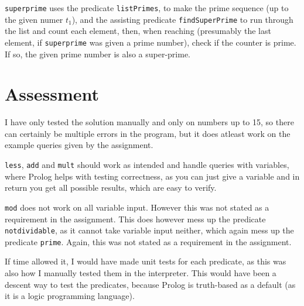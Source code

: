 \documentclass[a4paper, 10pt]{article}
\begin{document}
\texttt{superprime} uses the predicate \texttt{listPrimes}, to make the prime sequence (up to the given numer $t_1$), and the assisting predicate \texttt{findSuperPrime} to run through the list and count each element, then, when reaching (presumably the last element, if \texttt{superprime} was given a prime number), check if the counter is prime. If so, the given prime number is also a super-prime.


\section*{Assessment}
I have only tested the solution manually and only on numbers up to 15, so there can certainly be multiple errors in the program, but it does atleast work on the example queries given by the assignment.

\texttt{less}, \texttt{add} and \texttt{mult} should work as intended and handle queries with variables, where Prolog helps with testing correctness, as you can just give a variable and in return you get all possible results, which are easy to verify.

\texttt{mod} does not work on all variable input. However this was not stated as a requirement in the assignment. This does however mess up the predicate \texttt{notdividable}, as it cannot take variable input neither, which again mess up the predicate \texttt{prime}. Again, this was not stated as a requirement in the assignment.

If time allowed it, I would have made unit tests for each predicate, as this was also how I manually tested them in the interpreter. This would have been a descent way to test the predicates, because Prolog is truth-based as a default (as it is a logic programming language).
\end{document}
